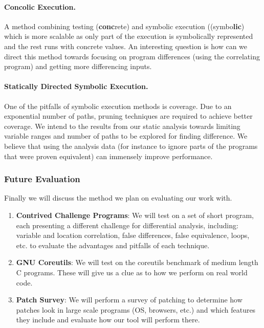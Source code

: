 \paragraph{Concolic Execution.} A method combining testing (\textbf{conc}rete)
    and symbolic execution ((symbo\textbf{lic}) which is more scalable as
    only part of the execution is symbolically represented and the rest
    runs with concrete values. An interesting question is how can we
    direct this method towards focusing on program differences (using the
    correlating program) and getting more differencing inputs.

\paragraph{Statically Directed Symbolic Execution.} One of the pitfalls of
    symbolic execution methods is coverage. Due to an exponential number
    of paths, pruning techniques are required to achieve better coverage.
    We intend to the results from our static analysis towards limiting
    variable ranges and number of paths to be explored for finding
    difference. We believe that using the analysis data (for instance to
    ignore parts of the programs that were proven equivalent) can
    immensely improve performance.

\subsubsection{Future Evaluation}

Finally we will discuss the method we plan on evaluating our work with.
\begin{enumerate}
\item \textbf{Contrived Challenge Programs}: We will test on a set of short program, each presenting a different challenge for differential analysis, including: variable and location correlation, false differences, false equivalence, loops, etc. to evaluate the advantages and pitfalls of each technique.
\item \textbf{GNU Coreutils}: We will test on the coreutils benchmark of medium length C programs. These will give us a clue as to how we perform on real world code.
\item \textbf{Patch Survey}: We will perform a survey of patching to determine how patches look in large scale programs (OS, browsers, etc.) and which features they include and evaluate how our tool will perform there.
\end{enumerate}

